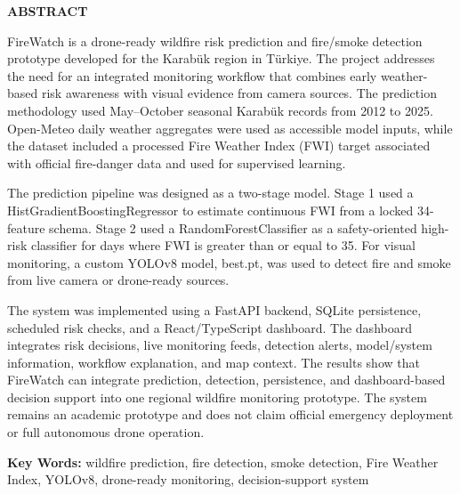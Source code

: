 \clearpage
\thispagestyle{plain}
{}

\begin{center}
{\bfseries\Large ABSTRACT\par}

\end{center}

\vspace{0.8cm}

\noindent
FireWatch is a drone-ready wildfire risk prediction and fire/smoke detection
prototype developed for the Karabük region in Türkiye. The project addresses
the need for an integrated monitoring workflow that combines early
weather-based risk awareness with visual evidence from camera sources. The
prediction methodology used May--October seasonal Karabük records from 2012
to 2025. Open-Meteo daily weather aggregates were used as accessible model
inputs, while the dataset included a processed Fire Weather Index
(FWI) target associated with official fire-danger data and used for supervised
learning.

The prediction pipeline was designed as a two-stage model. Stage 1 used a
HistGradientBoostingRegressor to estimate continuous FWI from a locked
34-feature schema. Stage 2 used a RandomForestClassifier as a safety-oriented
high-risk classifier for days where FWI is greater than or equal to 35. For
visual monitoring, a custom YOLOv8 model, best.pt, was used to detect fire
and smoke from live camera or drone-ready sources.

The system was implemented using a FastAPI backend, SQLite persistence,
scheduled risk checks, and a React/TypeScript dashboard. The dashboard
integrates risk decisions, live monitoring feeds, detection alerts,
model/system information, workflow explanation, and map context. The results
show that FireWatch can integrate prediction, detection, persistence, and
dashboard-based decision support into one regional wildfire monitoring
prototype. The system remains an academic prototype and does not claim
official emergency deployment or full autonomous drone operation.

\vspace{0.8cm}

\noindent\textbf{Key Words:} wildfire prediction, fire detection, smoke detection, Fire Weather Index, YOLOv8, drone-ready monitoring, decision-support system

\clearpage
